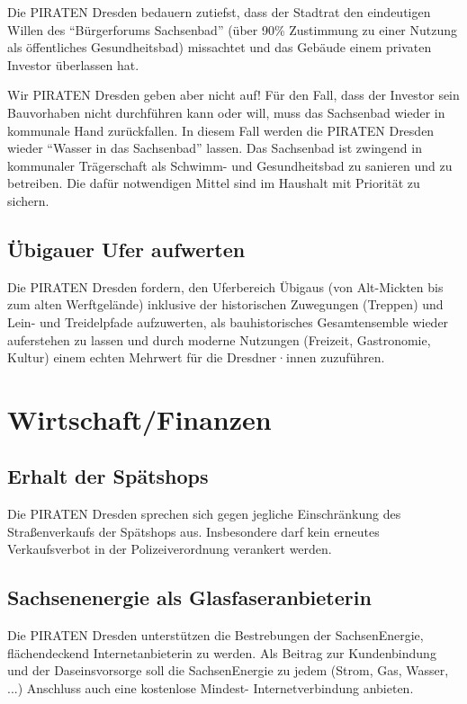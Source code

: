 \documentclass[a4paper, 11pt]{article}
\begin{document}
Die PIRATEN Dresden bedauern zutiefst, dass der Stadtrat den eindeutigen Willen des ``Bürgerforums Sachsenbad'' (über 90\% Zustimmung zu einer Nutzung als öffentliches Gesundheitsbad) missachtet und das Gebäude einem privaten Investor überlassen hat.\newline

Wir PIRATEN Dresden geben aber nicht auf! Für den Fall, dass der Investor sein Bauvorhaben nicht durchführen kann oder will, muss das Sachsenbad wieder in kommunale Hand zurückfallen. In diesem Fall werden die PIRATEN Dresden wieder ``Wasser in das Sachsenbad'' lassen. Das Sachsenbad ist zwingend in kommunaler Trägerschaft als Schwimm- und Gesundheitsbad zu sanieren und zu betreiben. Die dafür notwendigen Mittel sind im Haushalt mit Priorität zu sichern.


\subsection{Übigauer Ufer aufwerten}
Die PIRATEN Dresden fordern, den Uferbereich Übigaus (von Alt-Mickten bis zum alten Werftgelände) inklusive der historischen Zuwegungen (Treppen) und Lein- und Treidelpfade aufzuwerten, als bauhistorisches Gesamtensemble wieder auferstehen zu lassen und durch moderne Nutzungen (Freizeit, Gastronomie, Kultur) einem echten Mehrwert für die Dresdner·innen zuzuführen.


\section{Wirtschaft/Finanzen}

\subsection{Erhalt der Spätshops}
Die PIRATEN Dresden sprechen sich gegen jegliche Einschränkung des Straßenverkaufs der Spätshops aus. Insbesondere darf kein erneutes Verkaufsverbot in der Polizeiverordnung verankert werden.


\subsection{Sachsenenergie als Glasfaseranbieterin}
Die PIRATEN Dresden unterstützen die Bestrebungen der SachsenEnergie, flächendeckend Internetanbieterin zu werden. Als Beitrag zur Kundenbindung und der Daseinsvorsorge soll die SachsenEnergie zu jedem (Strom, Gas, Wasser, ...) Anschluss auch eine kostenlose Mindest- Internetverbindung anbieten.
\end{document}
